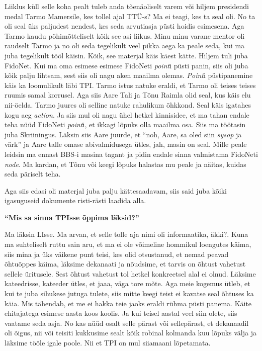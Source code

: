 Liiklus küll selle koha pealt tuleb anda tõenäoliselt varem või hiljem 
presidendi medal Tarmo Mamersile, kes tollel ajal 
TTÜ-s? Ma ei teagi, kes ta seal oli. No ta oli 
seal üks paljudest nendest, kes seda arvutiasja püsti hoidis esimesena. Aga 
Tarmo kaudu põhimõtteliselt kõik see asi liikus. Minu minu varane mentor oli 
raudselt Tarmo ja no oli seda tegelikult veel pikka aega ka peale seda, kui ma 
juba tegelikult tööl käisin. Kõik, see materjal käis käest kätte. Hiljem tuli 
juba FidoNet. Kui ma oma esimese esimese FidoNeti \emph{point}i 
püsti panin, siis oli juba kõik palju lihtsam, sest siis oli nagu aken maailma 
olemas. \emph{Point}i püstipanemine käis ka loomulikult läbi TPI. Tarmo 
istus natuke eraldi, et Tarmo oli teises teises ruumis samal korrusel. Aga siis 
Aare Tali ja Tõnu Raimla olid 
seal, kus käis elu nii-öelda.  Tarmo juures oli selline natuke rahulikum 
õhkkond. Seal käis igatahes kogu aeg \emph{action}. Ja siis mul oli nagu ühel 
hetkel kinnisidee, et ma tahan endale teha nüüd FidoNeti \emph{point}i, et 
ikkagi lõpuks olla maailma osa. Siis ma töötasin juba 
Skriiningus. Läksin siis Aare juurde, et \enquote{noh, Aare, 
sa oled siin \emph{sysop} ja värk} ja Aare talle omase abivalmidusega ütles, 
jah, masin on seal. Mille peale leidsin ma ennast BBS-i masina tagant ja pidin 
endale sinna valmistama FidoNeti \emph{node}. Ma kardan, et Tõnu või keegi 
lõpuks halastas mu peale ja näitas, kuidas seda päriselt teha. 

Aga siis edasi oli materjal juba palju kättesaadavam, siis said juba kõiki 
igasuguseid dokumente risti-rästi laadida alla. 

\textbf{\enquote{Mis sa sinna TPIsse õppima läksid?}}

Ma läksin LIsse. Ma arvan, et selle tolle aja nimi oli informaatika, äkki?. 
Kuna ma suhteliselt ruttu sain aru, et ma ei ole võimeline hommikul loengutes 
käima, siis mina ja üks väikene punt teisi, kes olid otsustanud, et nemad 
peavad õhtuõppes käima, läksime dekanaati ja nõudsime, et tarvis on õhtust 
vahetust sellele üritusele. Sest  õhtust vahetust tol hetkel konkreetsel alal 
ei olnud. Läksime kateedrisse, kateeder ütles, et jaaa, väga tore mõte. Aga 
meie kogemus ütleb, et kui te juba sihukese jutuga tulete, siis mitte keegi 
teist ei kavatse seal õhtuses ka käia. Mis tähendab, et me ei hakka teie jaoks  
eraldi rühma püsti panema. Käite ehitajatega esimese aasta koos koolis. Ja kui 
teisel aastal veel siin olete, siis vaatame seda asja. No kas nüüd osalt selle 
pärast või sellepärast, et dekanaadil oli õigus, nii või teisiti kukkusime 
sealt kõik robinal kolmanda kuu lõpuks välja ja läksime tööle igale poole. Nii 
et TPI on mul siiamaani lõpetamata. 

